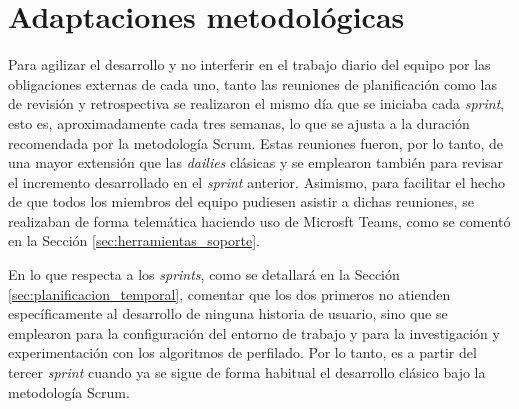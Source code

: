 \section{Adaptaciones metodológicas}
\label{sec:metodologia_eventos}

Para agilizar el desarrollo y no interferir en el trabajo diario del equipo por las obligaciones
externas de cada uno, tanto las reuniones de planificación como las de revisión y retrospectiva se realizaron
el mismo día que se iniciaba cada \textit{sprint}, esto es, aproximadamente cada tres semanas, lo que se ajusta a la duración recomendada
por la metodología Scrum. Estas reuniones fueron, por lo tanto, de una mayor extensión que las \textit{dailies} clásicas y se emplearon también
para revisar el incremento desarrollado en el \textit{sprint} anterior. Asimismo, para facilitar el hecho de que todos los miembros
del equipo pudiesen asistir a dichas reuniones, se realizaban de forma telemática haciendo uso de Microsft Teams, como se comentó en la Sección \ref{sec:herramientas_soporte}.

\bigskip
En lo que respecta a los \textit{sprints}, como se detallará en la Sección \ref{sec:planificacion_temporal}, comentar que los dos primeros
no atienden específicamente al desarrollo de ninguna historia de usuario, sino que se emplearon para la configuración del entorno de trabajo
y para la investigación y experimentación con los algoritmos de perfilado. Por lo tanto, es a partir del tercer \textit{sprint} cuando
ya se sigue de forma habitual el desarrollo clásico bajo la metodología Scrum.
